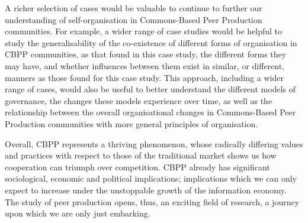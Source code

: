 A richer selection of cases would be valuable to continue to further our understanding of self-organisation in Commons-Based Peer Production communities. For example, a wider range of case studies would be helpful to study the generalisability of the co-existence of different forms of organisation in CBPP communities, as that found in this case study, the different forms they may have, and whether influences between them exist in similar, or different, manners as those found for this case study. This approach, including a wider range of cases, would also be useful to better understand the different models of governance, the changes these models experience over time, as well as the relationship between the overall organisational changes in Commons-Based Peer Production communities with more general principles of organisation.

Overall, CBPP represents a thriving phenomenon, whose radically differing values and practices with respect to those of the traditional market shows us how cooperation can triumph over competition. CBPP already has significant sociological, economic and political implications; implications which we can only expect to increase under the unstoppable growth of the information economy. The study of peer production opens, thus, an exciting field of research, a journey upon which we are only just embarking.